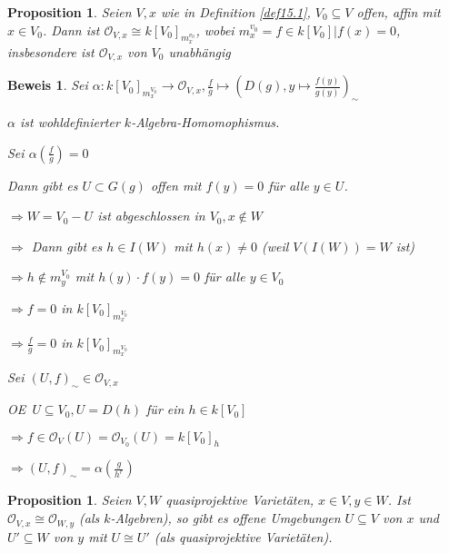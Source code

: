 \documentclass[a4paper, 12pt, numbers=noendperiod, chapterprefix=true]{scrbook}
\theoremstyle{break}
\newtheorem{Prop}[Def]{Proposition}
\theoremstyle{nonumberbreak}
\newtheorem{Bew}{Beweis}
\theoremstyle{nonumberplain}
\newcommand{\calO}{\mathcal{O}}
\renewcommand{\OE}{O\!\!E~}
\begin{document}
\begin{Prop}\label{prop15.4}
Seien $V,x$ wie in Definition \ref{def15.1}, $V_0\subseteq V$ offen, affin mit $x\in V_0$. Dann ist $\calO_{V,x}\cong k[V_0]_{m_x^{v_0}}$, wobei $m_x^{v_0}={f \in k[V_0] | f(x)=0}$, insbesondere ist $\calO_{V,x}$ von $V_0$ unabh\"angig
\end{Prop}

\begin{Bew}
Sei $\alpha:k[V_0]_{m_x^{V_0}}\to \calO_{V,x}, \frac{f}{g}\mapsto(D(g),y\mapsto\frac{f(y)}{g(y)})_\sim$

$\alpha$ ist wohldefinierter $k$-Algebra-Homomophismus.
\begin{description}[\setlabelstyle{\itshape}]
\item[$\alpha$ ist injektiv:]
	Sei $\alpha(\frac{f}{g})=0$
	
	Dann gibt es $U\subset G(g)$ offen mit $f(y)=0$ f\"ur alle $y\in U$.
	
	$\Rightarrow W=V_0-U$ ist abgeschlossen in $V_0, x\notin W$
	
	$\Rightarrow $ Dann gibt es $h\in I(W)$ mit $h(x)\ne0$ (weil $V(I(W))=W$ ist)
	
	$\Rightarrow h\notin m_y^{V_0}$ mit $h(y)\cdot f(y)=0$ f\"ur alle $y\in V_0$
	
	$\Rightarrow f=0$ in $k[V_0]_{m_x^{V_0}}$
	
	$\Rightarrow \frac{f}{g}=0$ in $k[V_0]_{m_x^{V_0}}$
\item[$\alpha$ ist surjektiv:]
	Sei $(U,f)_\sim\in\calO_{V,x}$
	
	\OE $U\subseteq V_0, U=D(h)$ f\"ur ein $h\in k[V_0]$
	
	$\Rightarrow f\in\calO_V(U)=\calO_{V_0}(U)=k[V_0]_h$
	
	$\Rightarrow (U,f)_\sim=\alpha(\frac{g}{h^r})$
\end{description}\end{Bew}

\begin{Prop}\label{prop15.5}
Seien $V,W$ quasiprojektive Variet\"aten, $x\in V, y\in W$. Ist $\calO_{V,x}\cong\calO_{W,y}$ (als $k$-Algebren), so gibt es offene Umgebungen $U\subseteq V$ von $x$ und $U'\subseteq W$ von $y$ mit $U\cong U'$ (als quasiprojektive Variet\"aten).
\end{Prop}
\end{document}
